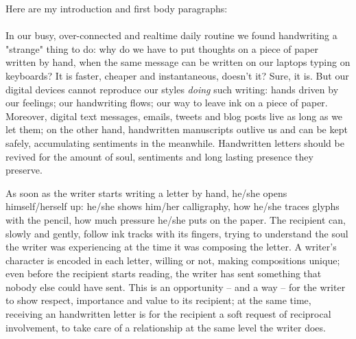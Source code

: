 Here are my introduction and first body paragraphs:
\\\\
In our busy, over-connected and realtime daily routine we found handwriting a "strange"
thing to do: why do we have to put thoughts on a piece of paper written by hand, when the same
message can be written on our laptops typing on keyboards? It is faster,
cheaper and instantaneous, doesn't it? Sure, it is. But our digital devices cannot
reproduce our styles \emph{doing} such writing: hands driven by our feelings; our handwriting
flows; our way to leave ink on a piece of paper. Moreover, digital text messages, emails, tweets and
blog posts live as long as we let them; on the other hand, handwritten manuscripts 
outlive us and can be kept safely, accumulating sentiments in the meanwhile.
Handwritten letters should be revived for the amount of soul, sentiments and 
long lasting presence they preserve.

As soon as the writer starts writing a letter by hand, he/she opens himself/herself up: he/she shows
him/her calligraphy, how he/she traces glyphs with the pencil, how much pressure he/she puts on the paper.
The recipient can, slowly and gently, follow ink tracks with its fingers, trying 
to understand the soul the writer was experiencing at the time it was composing the letter. 
A writer's character is encoded
in each letter, willing or not, making compositions unique; even before the recipient
starts reading, the writer has sent something that nobody else could have sent. 
This is an opportunity -- and a way -- for the writer to show respect, 
importance and value to its recipient;
at the same time, receiving an handwritten letter is for the recipient a soft request of 
reciprocal involvement, to take care of a relationship at the same level the writer does.
